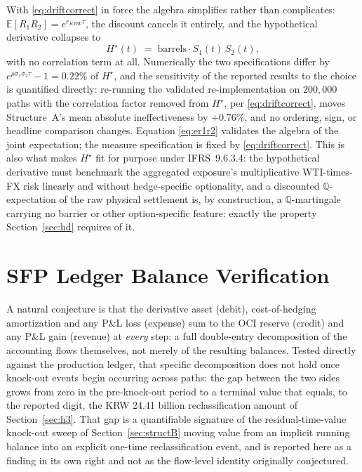 \documentclass[11pt,a4paper]{article}
\begin{document}
With \eqref{eq:driftcorrect} in force the algebra simplifies rather than complicates: $\mathbb E[R_1R_2]=e^{r_{KRW}\tau}$, the discount cancels it entirely, and the hypothetical derivative collapses to
\begin{equation}
H^\star(t) \;=\; \mathrm{barrels}\cdot S_1(t)\,S_2(t),
\label{eq:hstarsimple}
\end{equation}
with no correlation term at all. Numerically the two specifications differ by $e^{\rho\sigma_1\sigma_2\tau}-1=0.22\%$ of $H^\star$, and the sensitivity of the reported results to the choice is quantified directly: re-running the validated re-implementation on $200{,}000$ paths with the correlation factor removed from $H^\star$, per \eqref{eq:driftcorrect}, moves Structure~A's mean absolute ineffectiveness by $+0.76\%$, and no ordering, sign, or headline comparison changes. Equation \eqref{eq:er1r2} validates the algebra of the joint expectation; the measure specification is fixed by \eqref{eq:driftcorrect}. This is also what makes $H^\star$ fit for purpose under IFRS~9.6.3.4: the hypothetical derivative must benchmark the aggregated exposure's multiplicative WTI-times-FX risk linearly and without hedge-specific optionality, and a discounted $\mathbb Q$-expectation of the raw physical settlement is, by construction, a $\mathbb Q$-martingale carrying no barrier or other option-specific feature: exactly the property Section~\ref{sec:hd} requires of it.

\section{SFP Ledger Balance Verification}
\label{sec:appendixB}

A natural conjecture is that the derivative asset (debit), cost-of-hedging amortization and any P\&L loss (expense) sum to the OCI reserve (credit) and any P\&L gain (revenue) at \emph{every} step: a full double-entry decomposition of the accounting flows themselves, not merely of the resulting balances. Tested directly against the production ledger, that specific decomposition does not hold once knock-out events begin occurring across paths: the gap between the two sides grows from zero in the pre-knock-out period to a terminal value that equals, to the reported digit, the KRW 24.41 billion reclassification amount of Section~\ref{sec:h3}. That gap is a quantifiable signature of the residual-time-value knock-out sweep of Section~\ref{sec:structB} moving value from an implicit running balance into an explicit one-time reclassification event, and is reported here as a finding in its own right and not as the flow-level identity originally conjectured.
\end{document}
